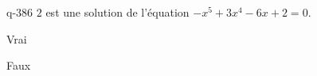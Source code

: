 \begin{truefalse}{q-386}
$2$ est une solution de l'équation $-x^5+3x^4-6x+2=0$.
\item Vrai
\item* Faux
\end{truefalse}

